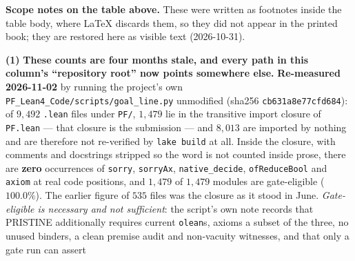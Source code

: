 \medskip
\noindent\textbf{Scope notes on the table above.} These were
written as footnotes inside the table body, where \LaTeX{}
discards them, so they did not appear in the printed book;
they are restored here as visible text (2026-10-31).
\begin{footnotesize}

\noindent\textbf{(1)} \textbf{These counts are four months stale, and every path in this column's ``repository root'' now points somewhere else.} \textbf{Re-measured 2026-11-02} by running the
project's own \texttt{PF\_Lean4\_Code/scripts/goal\_line.py} unmodified
(sha256 \texttt{cb631a8e\allowbreak{}77cfd684}): of $9{,}492$ \texttt{.lean}
files under \texttt{PF/}, \textbf{$1{,}479$} lie in the transitive import
closure of \texttt{PF.lean} --- that closure is the submission --- and $8{,}013$
are imported by nothing and are therefore not re-verified by \texttt{lake
build} at all. Inside the closure, with comments and docstrings stripped so the
word is not counted inside prose, there are \textbf{zero} occurrences of
\texttt{sorry}, \texttt{sorryAx}, \texttt{native\_decide}, \texttt{ofReduceBool}
and \texttt{axiom} at real code positions, and $1{,}479$ of $1{,}479$ modules
are gate-eligible ($100.0\%$). The earlier figure of $535$ files was the closure
as it stood in June. \emph{Gate-eligible is necessary and not sufficient}: the
script's own note records that PRISTINE additionally requires current
\texttt{olean}s, axioms a subset of the three, no unused binders, a clean
premise audit and non-vacuity witnesses, and that only a gate run can assert

\end{footnotesize}
